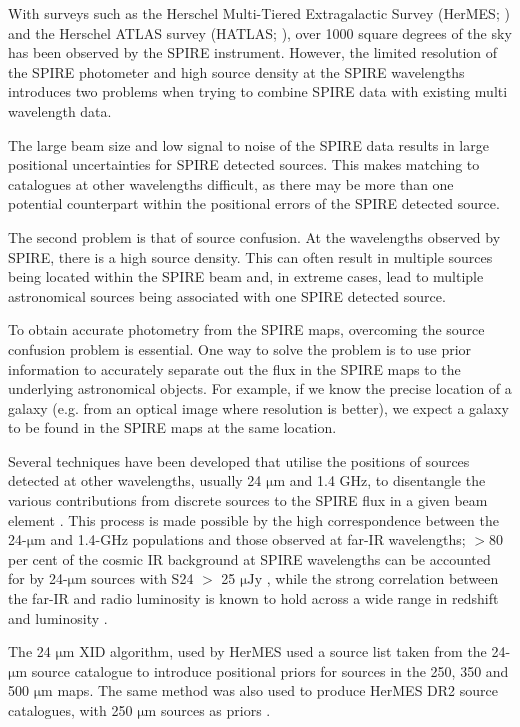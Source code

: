 \documentclass[useAMS,usenatbib]{mnras}
\begin{document}
With surveys such as the Herschel Multi-Tiered Extragalactic Survey (HerMES; \cite{Oliver:2012}) and the Herschel ATLAS survey (HATLAS; \cite{}), over 1000 square degrees of the sky has been observed by the SPIRE instrument. However, the limited resolution of the SPIRE photometer and high source density at the SPIRE wavelengths introduces two problems when trying to combine SPIRE data with existing multi wavelength data. 

The large beam size and low signal to noise of the SPIRE data results in large positional uncertainties for SPIRE detected sources. This makes matching to catalogues at other wavelengths difficult, as there may be more than one potential counterpart within the positional errors of the SPIRE detected source.

The second problem is that of source confusion. At the wavelengths observed by SPIRE, there is a high source density. This can often result in multiple sources being located within the SPIRE beam and, in extreme cases, lead to multiple astronomical sources being associated with one SPIRE detected source. 

To obtain accurate photometry from the SPIRE maps, overcoming the source confusion problem is essential. One way to solve the problem is to use prior information to accurately separate out the flux in the SPIRE maps to the underlying astronomical objects. For example, if we know the precise location of a galaxy (e.g. from an optical image where resolution is better), we expect a galaxy to be found in the SPIRE maps at the same location.

Several techniques have been developed that utilise the positions of sources detected at other wavelengths, usually 24 $\mathrm{\mu m}$ and 1.4 GHz, to disentangle the various contributions from discrete sources to the SPIRE flux in a given beam element \citep[e.g.][]{Roseboom:2010, Roseboom:2011, Chapin:2011}. This process is made possible by the high correspondence between the 24-$\mathrm{\mu m}$ and 1.4-GHz populations and those observed at far-IR wavelengths; $>$80 per cent of the cosmic IR background at SPIRE wavelengths can be accounted for by 24-$\mathrm{\mu m}$ sources with S24 $>$ 25 $\mathrm{\mu Jy}$ \citep{Marsden:2009, Pascale:2009}, while the strong correlation between the far-IR and radio luminosity is known to hold across a wide range in redshift and luminosity \citep[e.g.][]{Ivison:2010}.

The 24 $\mathrm{\mu m}$ XID algorithm, used by HerMES \citep{Roseboom:2010, Roseboom:2011} used a source list taken from the 24-$\mathrm{\mu m}$ source catalogue to introduce positional priors for sources in the 250, 350 and 500 $\mathrm{\mu m}$ maps. The same method was also used to produce HerMES DR2 source catalogues, with 250 $\mathrm{\mu m}$ sources as priors \citep[DESPHOT]{Wang:2014}. 
\end{document}

